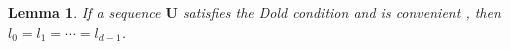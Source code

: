 \documentclass[preprint,12pt]{elsarticle}
\newcommand{\F}{\mathbb{F}}
\newcommand{\nice}{\textit{convenient} }
\newcommand{\lex}{\textit{Lex fundamentalis} }
\newtheorem{lemma}{Lemma}
\begin{document}



  

\begin{lemma}  \label{theor_Un}
    If a sequence ${\mathbf U}$ satisfies the Dold condition and is \nice\!\!, then $l_0=l_1=\cdots=l_{d-1}$.
\end{lemma}
\end{document}
